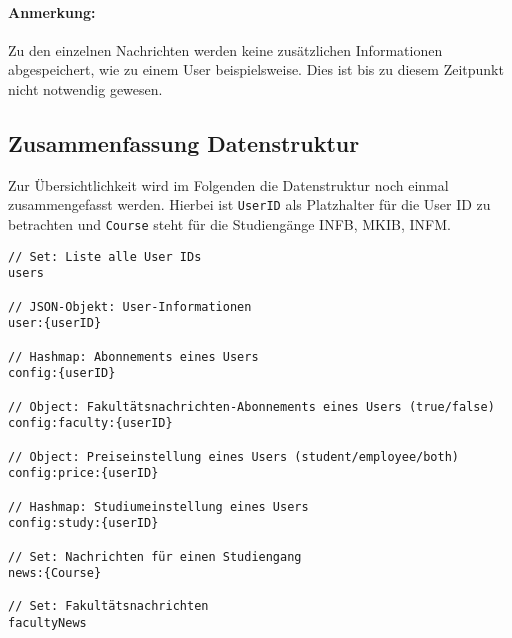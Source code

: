 \paragraph{Anmerkung:}{Zu den einzelnen Nachrichten werden keine zusätzlichen Informationen abgespeichert, wie zu einem User beispielsweise. Dies ist bis zu diesem Zeitpunkt nicht notwendig gewesen.}

\subsection{Zusammenfassung Datenstruktur}
Zur Übersichtlichkeit wird im Folgenden die Datenstruktur noch einmal zusammengefasst werden. Hierbei ist \texttt{UserID} als Platzhalter für die User ID zu betrachten und \texttt{Course} steht für die Studiengänge INFB, MKIB, INFM.

\begin{lstlisting}[caption={Auflistung der bekannten Fakultätsnachrichten}]
// Set: Liste alle User IDs
users

// JSON-Objekt: User-Informationen
user:{userID}

// Hashmap: Abonnements eines Users
config:{userID}

// Object: Fakultätsnachrichten-Abonnements eines Users (true/false)
config:faculty:{userID}

// Object: Preiseinstellung eines Users (student/employee/both)
config:price:{userID}

// Hashmap: Studiumeinstellung eines Users
config:study:{userID}

// Set: Nachrichten für einen Studiengang
news:{Course}

// Set: Fakultätsnachrichten
facultyNews
\end{lstlisting}
